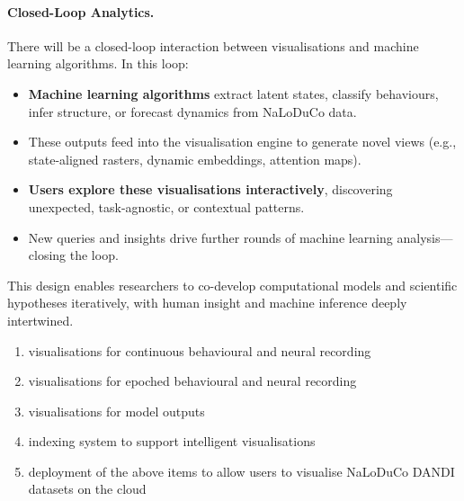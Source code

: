 \paragraph{Closed-Loop Analytics.} There will be a closed-loop interaction
between visualisations and machine learning algorithms. In this loop:

\begin{itemize}

	\item \textbf{Machine learning algorithms} extract latent states, classify
	behaviours, infer structure, or forecast dynamics from NaLoDuCo data.

	\item These outputs feed into the visualisation engine to generate novel
	views (e.g., state-aligned rasters, dynamic embeddings, attention maps).

	\item \textbf{Users explore these visualisations interactively},
	discovering unexpected, task-agnostic, or contextual patterns.

	\item New queries and insights drive further rounds of machine learning
	analysis—closing the loop.

\end{itemize}

This design enables researchers to co-develop computational models and
scientific hypotheses iteratively, with human insight and machine inference
deeply intertwined.


\begin{enumerate}

	\item visualisations for continuous behavioural and neural recording

	\item visualisations for epoched behavioural and neural recording

	\item visualisations for model outputs

	\item indexing system to support intelligent visualisations

	\item deployment of the above items to allow users to visualise NaLoDuCo
	DANDI datasets on the cloud

\end{enumerate}
